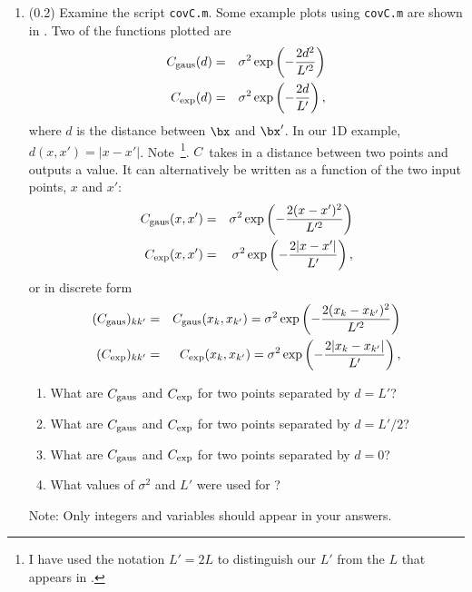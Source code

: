\documentclass[11pt,titlepage,fleqn]{article}
\begin{document}
\begin{enumerate}
\item (0.2) Examine the script \verb+covC.m+.
Some example plots using \verb+covC.m+ are shown in . Two of the functions plotted are
%
\begin{eqnarray}
C_{\rm gaus}(d) &=&
\sigma^2 \exp \left( - \frac{2 d^2}{L'^2} \right) 
\label{Cgaus1}
\\
C_{\rm exp}(d) &=&
\sigma^2 \exp \left( - \frac{2 d}{L'} \right)
,
\label{Cexp1}
\end{eqnarray}
%
where $d$ is the distance between $\bx$ and $\bx'$. In our 1D example, $d(x,x') = |x - x'|$. Note~\footnote{
I have used the notation $L' = 2L$ to distinguish our $L'$ from the $L$ that appears in \citet{Tarantola2005}.}.
%
$C$~takes in a distance between two points and outputs a value. It can alternatively be written as a function of the two input points, $x$ and $x'$:
%
\begin{eqnarray}
C_{\rm gaus}(x,x') &=&
\sigma^2 \exp \left( - \frac{2 (x-x')^2}{L'^2} \right) 
\\
C_{\rm exp}(x,x') &=&
\sigma^2 \exp \left( - \frac{2 |x-x'|}{L'} \right)
,
\end{eqnarray}
%
or in discrete form
%
\begin{eqnarray}
(C_{\rm gaus})_{kk'} &=& C_{\rm gaus}(x_k,x_{k'}) =
\sigma^2 \exp \left( - \frac{2 (x_k-x_{k'})^2}{L'^2} \right) 
\\
(C_{\rm exp})_{kk'} &=& C_{\rm exp}(x_k,x_{k'}) =
\sigma^2 \exp \left( - \frac{2 |x_k-x_{k'}|}{L'} \right)
,
\end{eqnarray}

\begin{enumerate}
\item What are $C_{\rm gaus}$ and $C_{\rm exp}$ for two points separated by $d = L'$?
\item What are $C_{\rm gaus}$ and $C_{\rm exp}$ for two points separated by $d = L'/2$?
\item What are $C_{\rm gaus}$ and $C_{\rm exp}$ for two points separated by $d = 0$?
\item What values of $\sigma^2$ and $L'$ were used for ?
\end{enumerate}
%
Note: Only integers and variables should appear in your answers.



\end{enumerate}
\end{document}
